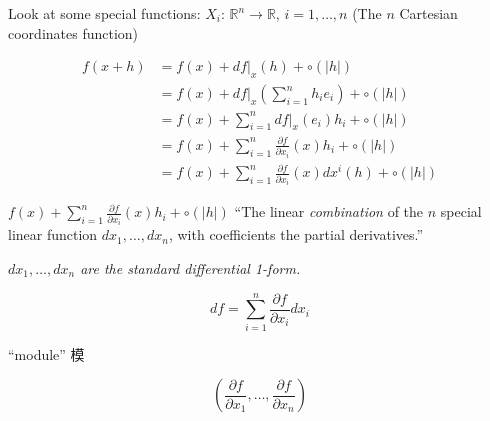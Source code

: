 Look at some special functions: $\boxed{X_i:\,\mathbb{R}^n\to\mathbb{R},\,i=1,\dots,n}$ (The $n$ Cartesian coordinates function)



\begin{align*}
    f(x+h) & =f(x)+df|_x(h)+\circ(|h|)                                                \\
           & =f(x)+df|_x\left(\sum_{i=1}^{n}h_ie_i\right)+\circ(|h|)                  \\
           & =f(x)+\sum_{i=1}^{n}df|_x(e_i)h_i+\circ(|h|)                             \\
           & =f(x)+\sum_{i=1}^{n}\frac{\partial f}{\partial x_i}(x)h_i+\circ(|h|)     \\
           & =f(x)+\sum_{i=1}^{n}\frac{\partial f}{\partial x_i}(x)dx^i(h)+\circ(|h|)
\end{align*}

$f(x)+\sum_{i=1}^{n}\frac{\partial f}{\partial x_i}(x)h_i+\circ(|h|)$ ``The linear \emph{combination} of the $n$ special linear function $dx_1,\dots,dx_n$, with coefficients the partial derivatives.''

\emph{$dx_1,\dots,dx_n$ are the standard differential 1-form.}


$$df=\sum_{i=1}^{n}\frac{\partial f}{\partial x_i}dx_i$$

``module'' 模

$$\left(\frac{\partial f}{\partial x_1},\dots,\frac{\partial f}{\partial x_n}\right)$$

